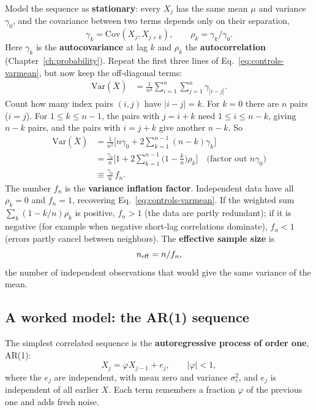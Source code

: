 Model the sequence as \textbf{stationary}: every $X_j$ has the same mean $\mu$ and variance $\gamma_0$, and the covariance between two terms depends only on their separation,
\begin{equation}
\gamma_k=\mathrm{Cov}(X_j,X_{j+k}),\qquad \rho_k=\gamma_k/\gamma_0 .
\label{eq:controls-autocov}
\end{equation}
Here $\gamma_k$ is the \textbf{autocovariance} at lag $k$ and $\rho_k$ the \textbf{autocorrelation} (Chapter~\ref{ch:probability}). Repeat the first three lines of Eq.~\eqref{eq:controls-varmean}, but now keep the off-diagonal terms:
\begin{align}
\mathrm{Var}(\bar X)&=\frac1{n^2}\sum_{i=1}^n\sum_{j=1}^n\gamma_{|i-j|}.
\label{eq:controls-doublesum}
\end{align}
Count how many index pairs $(i,j)$ have $|i-j|=k$. For $k=0$ there are $n$ pairs ($i=j$). For $1\le k\le n-1$, the pairs with $j=i+k$ need $1\le i\le n-k$, giving $n-k$ pairs, and the pairs with $i=j+k$ give another $n-k$. So
\begin{align}
\mathrm{Var}(\bar X)&=\frac1{n^2}\Big[n\gamma_0+2\sum_{k=1}^{n-1}(n-k)\gamma_k\Big]\nonumber\\
&=\frac{\gamma_0}{n}\Big[1+2\sum_{k=1}^{n-1}\Big(1-\frac kn\Big)\rho_k\Big]\quad\text{(factor out $n\gamma_0$)}\nonumber\\
&\equiv\frac{\gamma_0}{n}\,f_n .
\label{eq:controls-varcorr}
\end{align}
The number $f_n$ is the \textbf{variance inflation factor}. Independent data have all $\rho_k=0$ and $f_n=1$, recovering Eq.~\eqref{eq:controls-varmean}. If the weighted sum $\sum_k(1-k/n)\rho_k$ is positive, $f_n>1$ (the data are partly redundant); if it is negative (for example when negative short-lag correlations dominate), $f_n<1$ (errors partly cancel between neighbors). The \textbf{effective sample size} is
\begin{equation}
n_{\rm eff}=n/f_n,
\label{eq:controls-neff}
\end{equation}
the number of independent observations that would give the same variance of the mean.

\subsection{A worked model: the AR(1) sequence}

The simplest correlated sequence is the \textbf{autoregressive process of order one}, AR(1):
\begin{equation}
X_j=\varphi X_{j-1}+e_j,\qquad |\varphi|<1,
\label{eq:controls-ar1}
\end{equation}
where the $e_j$ are independent, with mean zero and variance $\sigma_e^2$, and $e_j$ is independent of all earlier $X$. Each term remembers a fraction $\varphi$ of the previous one and adds fresh noise.

